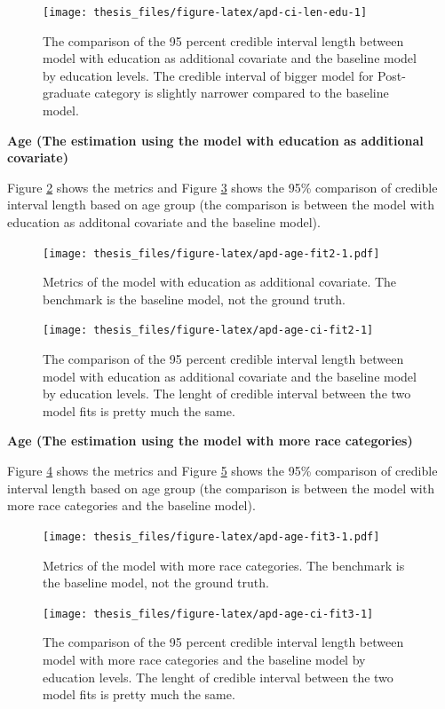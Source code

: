 \documentclass{monashthesis}
\begin{document}
\begin{figure}
\texttt{[image: thesis\_files/figure-latex/apd-ci-len-edu-1]} \caption{The comparison of the 95 percent credible interval length between model with education as additional covariate and the baseline model by education levels. The credible interval of bigger model for Post-graduate category is slightly narrower compared to the baseline model.}\label{fig:apd-ci-len-edu}
\end{figure}

\newpage

\textbf{Age (The estimation using the model with education as additional covariate)}

Figure \ref{fig:apd-age-fit2} shows the metrics and Figure \ref{fig:apd-age-ci-fit2} shows the 95\% comparison of credible interval length based on age group (the comparison is between the model with education as additonal covariate and the baseline model).

\begin{figure}
\centering
\texttt{[image: thesis\_files/figure-latex/apd-age-fit2-1.pdf]}
\caption{\label{fig:apd-age-fit2}Metrics of the model with education as additional covariate. The benchmark is the baseline model, not the ground truth.}
\end{figure}

\begin{figure}
\texttt{[image: thesis\_files/figure-latex/apd-age-ci-fit2-1]} \caption{The comparison of the 95 percent credible interval length between model with education as additional covariate and the baseline model by education levels. The lenght of credible interval between the two model fits is pretty much the same.}\label{fig:apd-age-ci-fit2}
\end{figure}

\newpage

\textbf{Age (The estimation using the model with more race categories)}

Figure \ref{fig:apd-age-fit3} shows the metrics and Figure \ref{fig:apd-age-ci-fit3} shows the 95\% comparison of credible interval length based on age group (the comparison is between the model with more race categories and the baseline model).

\begin{figure}
\centering
\texttt{[image: thesis\_files/figure-latex/apd-age-fit3-1.pdf]}
\caption{\label{fig:apd-age-fit3}Metrics of the model with more race categories. The benchmark is the baseline model, not the ground truth.}
\end{figure}

\begin{figure}
\texttt{[image: thesis\_files/figure-latex/apd-age-ci-fit3-1]} \caption{The comparison of the 95 percent credible interval length between model with more race categories and the baseline model by education levels. The lenght of credible interval between the two model fits is pretty much the same.}\label{fig:apd-age-ci-fit3}
\end{figure}

\printbibliography[heading=bibintoc]
\end{document}
